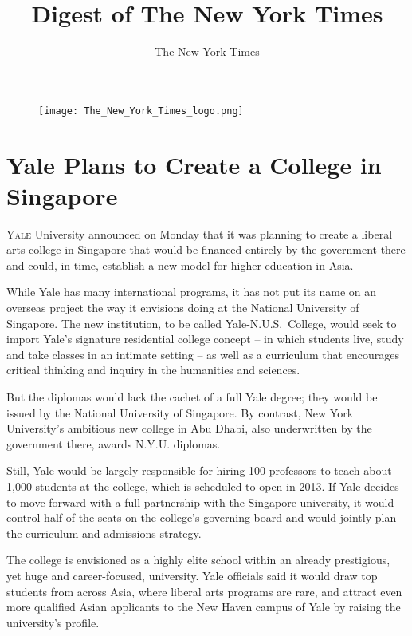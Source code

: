 ﻿\documentclass[12pt]{article}
\title{Digest of The New York Times}
\author{The New York Times}
\begin{document}
\date{}
\thispagestyle{empty}

\begin{figure}
\texttt{[image: The\_New\_York\_Times\_logo.png]}
\vspace{-20ex}
\end{figure}
\renewcommand\contentsname{}
{\footnotesize\textsf{\tableofcontents}}

\clearpage
\setcounter{page}{1}


\pagebreak
\section{Yale Plans to Create a College in Singapore}

\lettrine{Y}{ale} University announced on Monday that it was planning to
create a liberal arts college in Singapore that would be financed entirely by the government there
and could, in time, establish a new model for higher education in Asia.

While Yale has many international programs, it has not put its name on an overseas project the way
it envisions doing at the National University of Singapore. The new institution, to be called
Yale-N.U.S.~College, would seek to import Yale's signature residential college concept -- in which
students live, study and take classes in an intimate setting -- as well as a curriculum that
encourages critical thinking and inquiry in the humanities and sciences.

But the diplomas would lack the cachet of a full Yale degree; they would be issued by the National
University of Singapore. By contrast, New York University's ambitious new college in Abu Dhabi, also
underwritten by the government there, awards N.Y.U. diplomas.

Still, Yale would be largely responsible for hiring 100 professors to teach about 1,000 students at
the college, which is scheduled to open in 2013. If Yale decides to move forward with a full
partnership with the Singapore university, it would control half of the seats on the college's
governing board and would jointly plan the curriculum and admissions strategy.

The college is envisioned as a highly elite school within an already prestigious, yet huge and
career-focused, university. Yale officials said it would draw top students from across Asia, where
liberal arts programs are rare, and attract even more qualified Asian applicants to the New Haven
campus of Yale by raising the university's profile.
\end{document}
